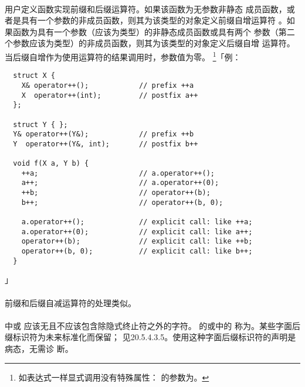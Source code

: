 \paragraph{}
用户定义函数实现前缀和后缀\tm{++}运算符。如果该函数为无参数非静态
成员函数，或者是具有一个参数的非成员函数，则其为该类型的对象定义前缀自增运算符
\tm{++}。如果函数为具有一个参数（应该为类型）的非静态成员函数或具有两个
参数（第二个参数应该为类型）的非成员函数，则其为该类型的对象定义后缀自增
运算符\tm{++}。当后缀自增作为使用\tm{++}运算符的结果调用时，参数值为零。
\footnote{如表达式一样显式调用没有特殊属性：
的参数为。}「例：
\begin{lstlisting}
  struct X {
    X& operator++();            // prefix ++a
    X  operator++(int);         // postfix a++
  };

  struct Y { };
  Y& operator++(Y&);            // prefix ++b
  Y  operator++(Y&, int);       // postfix b++

  void f(X a, Y b) {
    ++a;                        // a.operator++();
    a++;                        // a.operator++(0);
    ++b;                        // operator++(b);
    b++;                        // operator++(b, 0);

    a.operator++();             // explicit call: like ++a;
    a.operator++(0);            // explicit call: like a++;
    operator++(b);              // explicit call: like ++b;
    operator++(b, 0);           // explicit call: like b++;
  }
\end{lstlisting}」

\paragraph{}
前缀和后缀自减运算符\tm{-{}-}的处理类似。


\paragraph{}
中或
应该无且不应该包含除隐式终止符之外的字符。
的或中的
称为。某些字面后缀标识符为未来标准化而保留；
见20.5.4.3.5。使用这种字面后缀标识符的声明是病态，无需诊
断。

